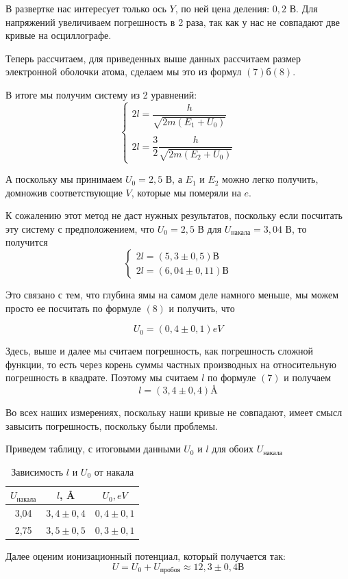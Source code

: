 \documentclass[a4paper, 12pt]{article}%
\begin{document}
В развертке нас интересует только ось $Y$, по ней цена деления: $0,2$ В. Для напряжений увеличиваем погрешность в 2 раза, так как у нас не совпадают две кривые на осциллографе.

Теперь рассчитаем, для приведенных выше данных рассчитаем размер электронной оболочки атома, сделаем мы это из формул $(7)б (8)$.

В итоге мы получим систему из 2 уравнений: 
\begin{equation}
\left\lbrace \begin{array}{l}
2l = \dfrac{h}{\sqrt{2m(E_1 + U_0)}}\\
 \\
2l = \dfrac{3}{2}\dfrac{h}{\sqrt{2m(E_2 + U_0)}} 
\end{array} \right.
\end{equation}

А поскольку мы принимаем $U_0 = 2,5$ В, а $E_1$ и $E_2$ можно легко получить, домножив соответствующие $V$, которые мы померяли на $e$. 

К сожалению этот метод не даст нужных результатов, поскольку если посчитать эту систему с предположением, что $U_0 = 2,5$ В для $U_\text{накала} = 3,04$ В, то получится
\[
\left\lbrace \begin{array}{l}
2l = (5,3\pm 0,5) \text{В}\\
2l =  (6,04 \pm 0,11) \text{В}
\end{array} \right.
\]

Это связано с тем, что глубина ямы на самом деле намного меньше, мы можем просто ее посчитать по формуле $(8)$ и получить, что 

\[U_0 = (0,4 \pm 0,1) eV\]

Здесь, выше и далее мы считаем погрешность, как погрешность сложной функции, то есть через корень суммы частных производных на относительную погрешность в квадрате.
Поэтому мы считаем $l$ по формуле $(7)$ и получаем
\[l = (3,4 \pm 0,4) \text{\AA}\]

Во всех наших измерениях, поскольку наши кривые не совпадают, имеет смысл завысить погрешность, поскольку были проблемы.

Приведем таблицу, с итоговыми данными $U_0$ и $l$ для обоих $U_{\text{накала}}$

\begin{table}[h]
\begin{center}
\begin{tabular}{|c|c|c|}
\hline
$U_{\text{накала}}$ & $l$, \AA & $U_0, eV$     \\ \hline
3,04                & $3,4\pm0,4$             & $0,4\pm0,1$ \\ \hline
2,75                & $3,5\pm0,5$             & $0,3\pm0,1$ \\ \hline
\end{tabular}
\caption{Зависимость $l$ и $U_0$ от накала}
\end{center}
\end{table}
Далее оценим ионизационный потенциал, который получается так:
\[U = U_0 + U_{\text{пробоя}} \approx 12,3 \pm 0,4 \text{В}\]
\end{document}

